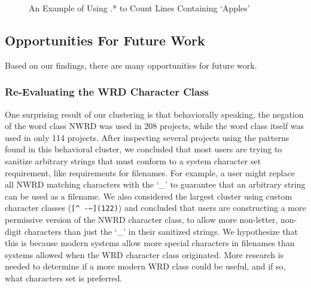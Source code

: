 

\begin{figure}[tb]
\centering
{}
\caption{An Example of Using .* to Count Lines Containing `Apples'}
\label{fig:lineSearch}
\end{figure}


\subsection{Opportunities For Future Work}

Based on our findings, there are many opportunities for future work.

\subsubsection{Re-Evaluating the WRD Character Class}
One surprising result of our clustering is that behaviorally speaking, the negation of the word class NWRD was used in 208 projects, while the word class itself was used in only 114 projects. After inspecting several projects using the patterns found in this behavioral cluster, we concluded that most users are trying to sanitize arbitrary strings that must conform to a system character set requirement, like requirements for filenames.  For example, a user might replace all NWRD matching characters with the `\_' to guarantee that an arbitrary string can be used as a filename.  We also considered the largest cluster using custom character classes (\verb•[^ -~](122)•) and concluded that users are constructing a more permissive version of the NWRD character class, to allow more non-letter, non-digit characters than just the `\_' in their sanitized strings.  We hypothesize that this is because modern systems allow more special characters in filenames than systems allowed when the WRD character class originated.  More research is needed to determine if a more modern WRD class could be useful, and if so, what characters set is preferred.

